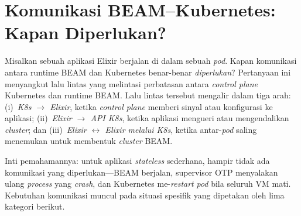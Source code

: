 \section{Komunikasi BEAM--Kubernetes: Kapan Diperlukan?}
\label{sec:komunikasi}

Misalkan sebuah aplikasi Elixir berjalan di dalam sebuah \emph{pod}. Kapan komunikasi
antara runtime BEAM dan Kubernetes benar-benar \emph{diperlukan}? Pertanyaan ini
menyangkut lalu lintas yang melintasi perbatasan antara \emph{control plane} Kubernetes
dan runtime BEAM. Lalu lintas tersebut mengalir dalam tiga arah: (i)~\emph{K8s
$\rightarrow$ Elixir}, ketika \emph{control plane} memberi sinyal atau konfigurasi ke
aplikasi; (ii)~\emph{Elixir $\rightarrow$ API K8s}, ketika aplikasi mengueri atau
mengendalikan \emph{cluster}; dan (iii)~\emph{Elixir $\leftrightarrow$ Elixir melalui
K8s}, ketika antar-\emph{pod} saling menemukan untuk membentuk \emph{cluster} BEAM.

Inti pemahamannya: untuk aplikasi \emph{stateless} sederhana, hampir tidak ada komunikasi
yang diperlukan---BEAM berjalan, supervisor OTP menyalakan ulang \emph{process} yang
\emph{crash}, dan Kubernetes me-\emph{restart} \emph{pod} bila seluruh VM mati. Kebutuhan
komunikasi muncul pada situasi spesifik yang dipetakan oleh lima kategori berikut.

